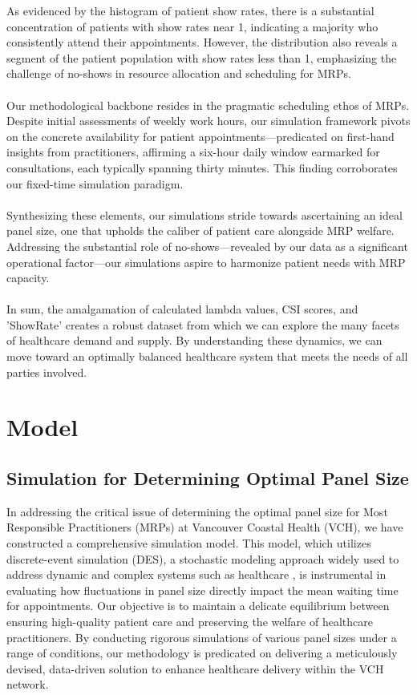 \documentclass[11pt]{article}
\theoremstyle{definition}
\begin{document}
As evidenced by the histogram of patient show rates, there is a substantial concentration of patients with show rates near 1, indicating a majority who consistently attend their appointments. However, the distribution also reveals a segment of the patient population with show rates less than 1, emphasizing the challenge of no-shows in resource allocation and scheduling for MRPs.\\\\
Our methodological backbone resides in the pragmatic scheduling ethos of MRPs. Despite initial assessments of weekly work hours, our simulation framework pivots on the concrete availability for patient appointments—predicated on first-hand insights from practitioners, affirming a six-hour daily window earmarked for consultations, each typically spanning thirty minutes. This finding corroborates our fixed-time simulation paradigm.\\\\
Synthesizing these elements, our simulations stride towards ascertaining an ideal panel size, one that upholds the caliber of patient care alongside MRP welfare. Addressing the substantial role of no-shows—revealed by our data as a significant operational factor—our simulations aspire to harmonize patient needs with MRP capacity.\\\\
In sum, the amalgamation of calculated lambda values, CSI scores, and 'ShowRate' creates a robust dataset from which we can explore the many facets of healthcare demand and supply. By understanding these dynamics, we can move toward an optimally balanced healthcare system that meets the needs of all parties involved.

\section{Model}

\subsection*{Simulation for Determining Optimal Panel Size}

In addressing the critical issue of determining the optimal panel size for Most Responsible Practitioners (MRPs) at Vancouver Coastal Health (VCH), we have constructed a comprehensive simulation model. This model, which utilizes discrete-event simulation (DES), a stochastic modeling approach widely used to address dynamic and complex systems such as healthcare \cite{Vázquez-Serrano2021}, is instrumental in evaluating how fluctuations in panel size directly impact the mean waiting time for appointments. Our objective is to maintain a delicate equilibrium between ensuring high-quality patient care and preserving the welfare of healthcare practitioners. By conducting rigorous simulations of various panel sizes under a range of conditions, our methodology is predicated on delivering a meticulously devised, data-driven solution to enhance healthcare delivery within the VCH network.
\end{document}
